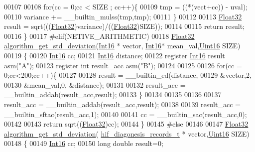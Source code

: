 \begin{DoxyCode}
00107   
00108     \textcolor{keywordflow}{for}(cc = 0;cc < SIZE ; cc++)\{
00109           tmp       = ((*(vect+cc)) - uval);
00110           variance += \_\_builtin\_mulss(tmp,tmp);
00111     \}
00112 
00113     \hyperlink{a00072_a87d38f886e617ced2698fc55afa07637}{Float32} result =  sqrt(((\hyperlink{a00072_a87d38f886e617ced2698fc55afa07637}{Float32})variance)/((\hyperlink{a00072_a87d38f886e617ced2698fc55afa07637}{Float32})SIZE));
00114   
00115     \textcolor{keywordflow}{return} result;
00116 \}
00117 \textcolor{preprocessor}{#elif(NETIVE\_ARITHMETIC)}
00118 \hyperlink{a00072_a87d38f886e617ced2698fc55afa07637}{Float32} \hyperlink{a00038_a97eb6437dda088f144d791e49cd3dc2a}{algorithm\_get\_std\_deviation}(\hyperlink{a00072_a659ce9e5eb6571f9984ffc7caad2660a}{Int16} * vector,
      \hyperlink{a00072_a659ce9e5eb6571f9984ffc7caad2660a}{Int16}* mean\_val,\hyperlink{a00072_a59a9f6be4562c327cbfb4f7e8e18f08b}{Uint16} SIZE)
00119 \{
00120     \hyperlink{a00072_a659ce9e5eb6571f9984ffc7caad2660a}{Int16} cc;
00121     \hyperlink{a00072_a659ce9e5eb6571f9984ffc7caad2660a}{Int16} distance;
00122     \textcolor{keyword}{register} \hyperlink{a00072_a659ce9e5eb6571f9984ffc7caad2660a}{Int16} result     \textcolor{keyword}{asm}(\textcolor{stringliteral}{"A"});
00123     \textcolor{keyword}{register} \textcolor{keywordtype}{int} result\_acc   \textcolor{keyword}{asm}(\textcolor{stringliteral}{"B"});
00124 
00125 
00126      \textcolor{keywordflow}{for}(cc = 0;cc<200;cc++)\{
00127 
00128         result      = \_\_builtin\_ed(distance,
00129                                 &vector,2,
00130                                 &mean\_val,0, &distance);
00131 
00132         result\_acc  = \_\_builtin\_addab(result\_acc,result);
00133       \}
00134 
00135 
00136 
00137         result\_acc  = \_\_builtin\_addab(result\_acc,result);
00138 
00139         result\_acc = \_\_builtin\_sftac(result\_acc,1);
00140     
00141         cc = \_\_builtin\_sac(result\_acc,0);
00142    
00143         \textcolor{keywordflow}{return} sqrt((\hyperlink{a00072_a87d38f886e617ced2698fc55afa07637}{Float32})cc);
00144 \}
00145 \textcolor{preprocessor}{#else}
00146 
00147 \hyperlink{a00072_a87d38f886e617ced2698fc55afa07637}{Float32} \hyperlink{a00038_a97eb6437dda088f144d791e49cd3dc2a}{algorithm\_get\_std\_deviation}(
      \hyperlink{a00022_a4726b814166e222a6f13e21453f76d8d}{hif\_diagonesis\_records\_t} * vector,\hyperlink{a00072_a59a9f6be4562c327cbfb4f7e8e18f08b}{Uint16} SIZE)
00148 \{
00149     \hyperlink{a00072_a659ce9e5eb6571f9984ffc7caad2660a}{Int16} cc;
00150     \textcolor{keywordtype}{long} \textcolor{keywordtype}{double} result=0;

\end{DoxyCode}
